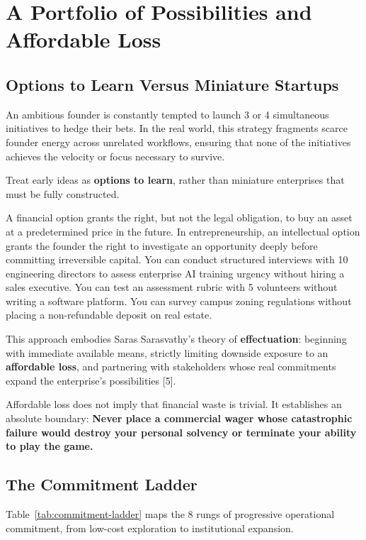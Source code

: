 \section{A Portfolio of Possibilities and Affordable Loss}

\subsection{Options to Learn Versus Miniature Startups}

An ambitious founder is constantly tempted to launch 3 or 4 simultaneous initiatives to hedge their bets. In the real world, this strategy fragments scarce founder energy across unrelated workflows, ensuring that none of the initiatives achieves the velocity or focus necessary to survive.

Treat early ideas as \textbf{options to learn}, rather than miniature enterprises that must be fully constructed.

A financial option grants the right, but not the legal obligation, to buy an asset at a predetermined price in the future. In entrepreneurship, an intellectual option grants the founder the right to investigate an opportunity deeply before committing irreversible capital. You can conduct structured interviews with 10 engineering directors to assess enterprise AI training urgency without hiring a sales executive. You can test an assessment rubric with 5 volunteers without writing a software platform. You can survey campus zoning regulations without placing a non-refundable deposit on real estate.

This approach embodies Saras Sarasvathy's theory of \textbf{effectuation}: beginning with immediate available means, strictly limiting downside exposure to an \textbf{affordable loss}, and partnering with stakeholders whose real commitments expand the enterprise's possibilities [5].

Affordable loss does not imply that financial waste is trivial. It establishes an absolute boundary: \textbf{Never place a commercial wager whose catastrophic failure would destroy your personal solvency or terminate your ability to play the game.}

\subsection{The Commitment Ladder}

Table~\ref{tab:commitment-ladder} maps the 8 rungs of progressive operational commitment, from low-cost exploration to institutional expansion.

